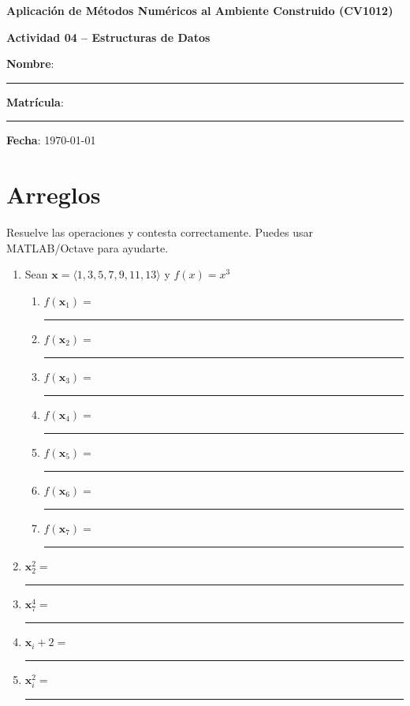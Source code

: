 \documentclass[spanish, 10pt]{article}
\newcommand{\shortresponserule}{{\large\rule{5 cm}{0.3mm}}}
\begin{document}
\begin{center}
    {\Large \textbf{Aplicación de Métodos Numéricos al Ambiente Construido (CV1012)}}
	
	\bigskip
	{\large \textbf{Actividad 04 -- Estructuras de Datos}}
\end{center}

\bigskip
{\large \textbf{Nombre}: \rule{13.7 cm}{0.4mm}}



\bigskip
{\large \textbf{Matrícula}: \rule{5 cm}{0.4mm}} \hfill {\large \textbf{Fecha}: \today}

\bigskip


\section{Arreglos}

Resuelve las operaciones y contesta correctamente. Puedes usar MATLAB/Octave para ayudarte.

\begin{enumerate}
    \itemsep2.5ex
    \item Sean $\mathbf{x} = \langle 1, 3, 5, 7, 9, 11, 13 \rangle$ y $f(x) = x^3$
        \bigskip
    \begin{enumerate}
        \item $f(\mathbf{x}_1) =$ \quad \; \shortresponserule
        \item $f(\mathbf{x}_2) =$ \quad \; \shortresponserule
        \item $f(\mathbf{x}_3) =$ \quad \; \shortresponserule
        \item $f(\mathbf{x}_4) =$ \quad \; \shortresponserule
        \item $f(\mathbf{x}_5) =$ \quad \; \shortresponserule
        \item $f(\mathbf{x}_6) =$ \quad \; \shortresponserule
        \item $f(\mathbf{x}_7) =$ \quad \; \shortresponserule
    \end{enumerate}
    \item $\mathbf{x}_2^2 =$ \hfill \shortresponserule
    \item $\mathbf{x}_7^4 =$ \hfill \shortresponserule
    \item $\mathbf{x}_i+2 =$  \hfill \shortresponserule
    \item $\mathbf{x}_i^2 =$  \hfill \shortresponserule
\end{enumerate}
\end{document}
